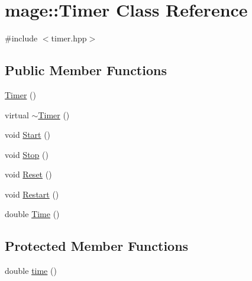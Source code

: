 \hypertarget{classmage_1_1_timer}{}\section{mage\+:\+:Timer Class Reference}
\label{classmage_1_1_timer}


{\ttfamily \#include $<$timer.\+hpp$>$}

\subsection*{Public Member Functions}
\begin{DoxyCompactItemize}
\item 
\hyperlink{classmage_1_1_timer_a5e1c0a3bb4491b3a43ce05874ad24055}{Timer} ()
\item 
virtual \hyperlink{classmage_1_1_timer_aa91cebe8c59c189fde93932fde10265c}{$\sim$\+Timer} ()
\item 
void \hyperlink{classmage_1_1_timer_a5855c9df8ad1a2b6774942e566833647}{Start} ()
\item 
void \hyperlink{classmage_1_1_timer_abf234f1e2ee9e760f316bd49500d5a3a}{Stop} ()
\item 
void \hyperlink{classmage_1_1_timer_a0675ff7bc0a8e7343b5a35f865cc9c1a}{Reset} ()
\item 
void \hyperlink{classmage_1_1_timer_a4e1ba19d02c290a18981db1766f006c3}{Restart} ()
\item 
double \hyperlink{classmage_1_1_timer_a5e4655ac296cc8971b54e5a76082f00f}{Time} ()
\end{DoxyCompactItemize}
\subsection*{Protected Member Functions}
\begin{DoxyCompactItemize}
\item 
double \hyperlink{classmage_1_1_timer_a782882e9dbe9a2843b5203ba13309b23}{time} ()
\end{DoxyCompactItemize}
